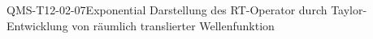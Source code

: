 
\begin{PROP}{QMS-T12-02-07}{Exponential Darstellung des RT-Operator durch Taylor-Entwicklung von räumlich translierter Wellenfunktion}
\end{PROP}
